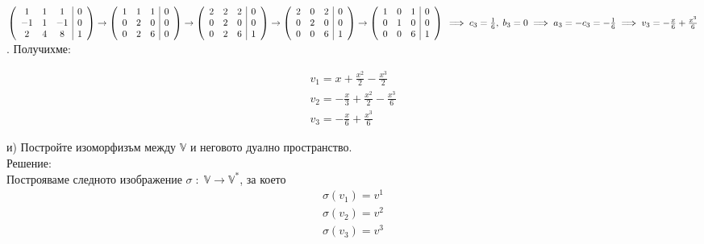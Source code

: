 \documentclass[12pt]{article}
\newcommand{\V}{\mathbb{V}}
\begin{document}
$\left(\begin{array}{ccc|c}
     1 & 1 &  1 & 0 \\
    -1 & 1 & -1 & 0 \\
     2 & 4 &  8 & 1
\end{array}\right) \to \left(\begin{array}{ccc|c}
    1 & 1 & 1 & 0 \\
    0 & 2 & 0 & 0 \\
    0 & 2 & 6 & 0
\end{array}\right) \to \left(\begin{array}{ccc|c}
    2 & 2 & 2 & 0 \\
    0 & 2 & 0 & 0 \\
    0 & 2 & 6 & 1
\end{array}\right) \to \left(\begin{array}{ccc|c}
    2 & 0 & 2 & 0 \\
    0 & 2 & 0 & 0 \\
    0 & 0 & 6 & 1
\end{array}\right) \to \left(\begin{array}{ccc|c}
    1 & 0 & 1 & 0 \\
    0 & 1 & 0 & 0 \\
    0 & 0 & 6 & 1
\end{array}\right) \\\\
\implies c_3 = \frac{1}{6}, \; b_3 = 0 \implies a_3 = -c_3 = -\frac{1}{6} \implies v_3 = -\frac{x}{6} + \frac{x^3}{6}$.
Получихме: 

\begin{align*}
    v_1 = x + \frac{x^2}{2} - \frac{x^3}{2} \\
    v_2 = -\frac{x}{3} + \frac{x^2}{2} - \frac{x^3}{6} \\
    v_3 = -\frac{x}{6} + \frac{x^3}{6}
\end{align*}

и) Постройте изоморфизъм между $\V$ и неговото дуално пространство. \\

Решение: \\

Построяваме следното изображение $\sigma \; : \; \V \to \V^*$, за което
\begin{align*}
    \sigma(v_1) = v^1 \\
    \sigma(v_2) = v^2 \\
    \sigma(v_3) = v^3
\end{align*}
\end{document}
